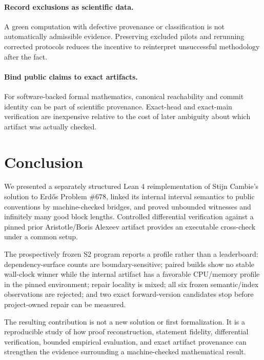 \documentclass[sigplan,10pt,anonymous,review]{acmart}
\begin{document}
\paragraph{Record exclusions as scientific data.}
A green computation with defective provenance or classification is not automatically admissible evidence. Preserving excluded pilots and rerunning corrected protocols reduces the incentive to reinterpret unsuccessful methodology after the fact.

\paragraph{Bind public claims to exact artifacts.}
For software-backed formal mathematics, canonical reachability and commit identity can be part of scientific provenance. Exact-head and exact-main verification are inexpensive relative to the cost of later ambiguity about which artifact was actually checked.

\section{Conclusion}
We presented a separately structured Lean 4 reimplementation of Stijn Cambie's solution to Erd\H{o}s Problem \#678, linked its internal interval semantics to public conventions by machine-checked bridges, and proved unbounded witnesses and infinitely many good block lengths. Controlled differential verification against a pinned prior Aristotle/Boris Alexeev artifact provides an executable cross-check under a common setup.

The prospectively frozen S2 program reports a profile rather than a leaderboard: dependency-surface counts are boundary-sensitive; paired builds show no stable wall-clock winner while the internal artifact has a favorable CPU/memory profile in the pinned environment; repair locality is mixed; all six frozen semantic/index observations are rejected; and two exact forward-version candidates stop before project-owned repair can be measured.

The resulting contribution is not a new solution or first formalization. It is a reproducible study of how proof reconstruction, statement fidelity, differential verification, bounded empirical evaluation, and exact artifact provenance can strengthen the evidence surrounding a machine-checked mathematical result.



\end{document}

